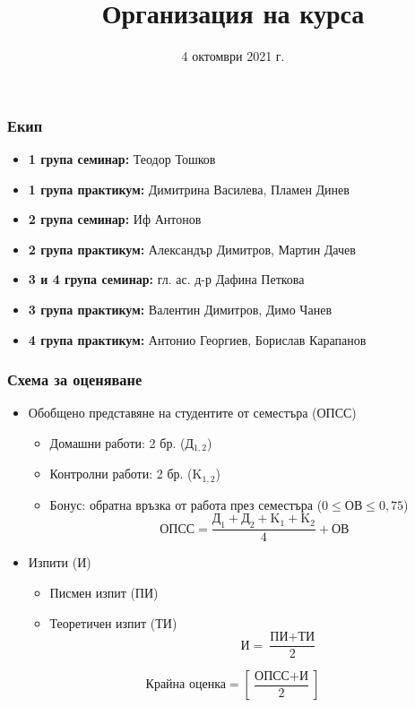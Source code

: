 \documentclass{beamer}
\title{Организация на курса}
\date{4 октомври 2021 г.}
\begin{document}
\begin{frame}
  \titlepage
\end{frame}

\begin{frame}
  \frametitle{Екип}

  \begin{itemize}
  \item \textbf{1 група семинар:} Теодор Тошков
  \item \textbf{1 група практикум:} Димитрина Василева, Пламен Динев
  \item \textbf{2 група семинар:} Иф Антонов
  \item \textbf{2 група практикум:} Александър Димитров, Мартин Дачев
  \item \textbf{3 и 4 група семинар:} гл. ас. д-р Дафина Петкова
  \item \textbf{3 група практикум:} Валентин Димитров, Димо Чанев
  \item \textbf{4 група практикум:} Антонио Георгиев, Борислав Карапанов
  \end{itemize}
\end{frame}

\begin{frame}
  \frametitle{Схема за оценяване}

  \begin{itemize}
  \item Обобщено представяне на студентите от семестъра (ОПСС)
    \begin{itemize}
    \item Домашни работи: 2 бр. (Д$_{1,2}$)
    \item Контролни работи: 2 бр. (K$_{1,2}$)
    \item Бонус: обратна връзка от работа през семестъра ($0 \leq \text{ОВ} \leq 0{,}75$)\\
      \begin{equation*}
        \text{ОПСС} = \frac{\text{Д}_1 + \text{Д}_2 + \text{K}_1 + \text{K}_2}4 + \text{ОВ} 
      \end{equation*}
    \end{itemize}
  \item Изпити (И)
    \begin{itemize}
    \item Писмен изпит (ПИ)
    \item Теоретичен изпит (ТИ)\\[-7.5ex]
      \begin{equation*}
        \qquad\qquad\text{И} = \frac{\text{ПИ} + \text{ТИ}}2
      \end{equation*}
    \end{itemize}
  \end{itemize}
  \vspace{2ex}
  \begin{equation*}
    \text{Крайна оценка} = \left[ \frac{\text{ОПСС} + \text{И}}2 \right]
  \end{equation*}
\end{frame}
\end{document}
